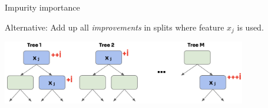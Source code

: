 \documentclass[11pt,compress,t,notes=noshow, xcolor=table]{beamer}
\begin{document}
\begin{frame2}[small]{Impurity importance}

Alternative: Add up all \textit{improvements} in splits where feature $x_j$ is used.

\vspace{-1ex}
\begin{center}
\includegraphics[width=0.8\textwidth]{figure_man/forest-fimp_impurity.png}
\end{center}

\begin{algorithm}[H]
\small
\begin{algorithmic}[1]
  \EndFor
  \EndFor
\end{algorithmic}
\end{algorithm}

\end{frame2}
\end{document}
